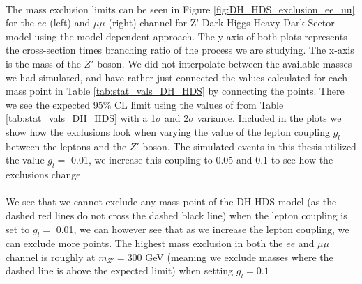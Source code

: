 \documentclass[12pt, a4paper]{book}
\begin{document}
\\The mass exclusion limits can be seen in Figure \ref{fig:DH_HDS_exclusion_ee_uu} for the $ee$ (left) and $\mu\mu$ (right) channel for Z' Dark Higgs Heavy Dark Sector model using the model dependent approach. The y-axis of both plots represents the cross-section times branching ratio of the process we are studying. 
The x-axis is the mass of the $Z'$ boson. We did not interpolate between the available masses we had simulated, and have rather just connected the values calculated for each mass point in Table \ref{tab:stat_vals_DH_HDS} by connecting the points. There we see the expected 95\% CL limit using 
the values of from Table \ref{tab:stat_vals_DH_HDS} with a 1$\sigma$ and 2$\sigma$ variance. Included in the plots we show how the exclusions look when varying the value of the lepton coupling $g_l$ between the leptons and the $Z'$ boson. The simulated events in this thesis utilized the value $g_l=$ 0.01, 
we increase this coupling to 0.05 and 0.1 to see how the exclusions change.\\
\\We see that we cannot exclude any mass point of the DH HDS model (as the dashed red lines do not cross the dashed black line) when the lepton coupling is set to $g_l=$ 0.01, we can however see that as we increase the lepton coupling, 
we can exclude more points. The highest mass exclusion in both the $ee$ and $\mu\mu$ channel is roughly at $m_{Z'}=300$ GeV (meaning we exclude masses where the dashed line is above the expected limit) when setting $g_{l}=0.1$
\clearpage
\end{document}
